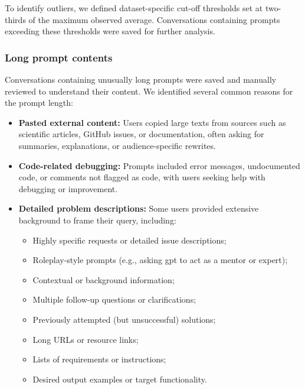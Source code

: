 To identify outliers, we defined dataset-specific cut-off thresholds set at two-thirds of the maximum observed average. Conversations containing prompts exceeding these thresholds were saved for further analysis.

\subsubsection{Long prompt contents}
Conversations containing unusually long prompts were saved and manually reviewed to understand their content. We identified several common reasons for the prompt length:
\begin{itemize}
    \item \textbf{Pasted external content:} Users copied large texts from sources such as scientific articles, GitHub issues, or documentation, often asking for summaries, explanations, or audience-specific rewrites.
    \item \textbf{Code-related debugging:} Prompts included error messages, undocumented code, or comments not flagged as code, with users seeking help with debugging or improvement.
    \item \textbf{Detailed problem descriptions: } Some users provided extensive background to frame their query, including:
    \begin{itemize}
        \item Highly specific requests or detailed issue descriptions;
        \item Roleplay-style prompts (e.g., asking \gls{gpt} to act as a mentor or expert);
        \item Contextual or background information;
        \item Multiple follow-up questions or clarifications;
        \item Previously attempted (but unsuccessful) solutions;
        \item Long URLs or resource links;
        \item Lists of requirements or instructions;
        \item Desired output examples or target functionality.
    \end{itemize}
\end{itemize}